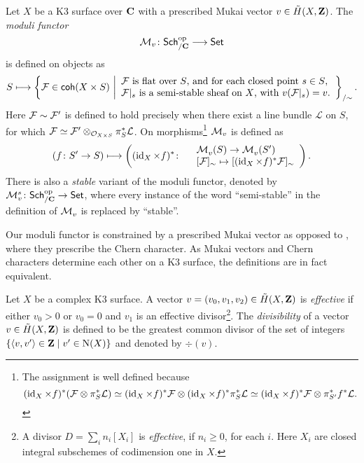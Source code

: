 \begin{definition}
    \label{Definition of moduli functor}
    Let $X$ be a K3 surface over $\mathbf C$ with a prescribed Mukai vector $v \in \,\tilde{\!{H}}(X, \mathbf Z)$. The \emph{moduli functor}
    \[
        \mathcal M_v \colon \mathsf{Sch}_{/\mathbf C}^{\text{op}} \longrightarrow \mathsf{Set}
    \]
    is defined on objects as 
    \[
        S \longmapsto \left\{\mathcal F \in \mathsf{coh}(X \times S) \ \middle| 
        \begin{array}{l}
            \text{$\mathcal F$ is flat over $S$, and for each closed point $s \in S$,} \\
            \text{$\mathcal F|_s$ is a semi-stable sheaf on $X$, with $v(\mathcal F|_s) = v$.}
        \end{array}
        \right\}_{/\sim}.
    \]
    Here $\mathcal F \sim \mathcal F'$ is defined to hold precisely when there exist a line bundle $\mathcal L$ on $S$, for which $\mathcal F \simeq \mathcal F' \otimes_{{\mathcal{O}_{X \times S}}} \pi_S^*\mathcal L$. On morphisms\footnote{
        The assignment is well defined because
        \[
            (\operatorname{id}_{X} \times f)^*(\mathcal F \otimes \pi_S^*\mathcal L) \simeq (\operatorname{id}_{X} \times f)^*\mathcal F \otimes (\operatorname{id}_{X} \times f)^*\pi_S^*\mathcal L \simeq (\operatorname{id}_{X} \times f)^*\mathcal F \otimes \pi_{S'}^*f^*\mathcal L.
        \]
    } $\mathcal M_v$ is defined as
    \[
        (f\colon S' \to S) \longmapsto \left( (\operatorname{id}_{X} \times f)^* \colon
            \begin{array}{r l}
                & \mathcal M^{}_v(S) \to \mathcal M^{}_v(S') \\
                & [\mathcal F]_\sim \mapsto [(\operatorname{id}_{X} \times f)^*\mathcal F]_\sim
            \end{array}
            \right).
    \]
    There is also a \emph{stable} variant of the moduli functor, denoted by $\mathcal M_v^{s} \colon \mathsf{Sch}_{/\mathbf C}^{\text{op}} \to \mathsf{Set}$, where every instance of the word ``semi-stable'' in the definition of $\mathcal M_v^{}$ is replaced by ``stable''.
\end{definition}

\begin{remark}
    Our moduli functor is constrained by a prescribed Mukai vector as opposed to \cite[\S 4.2, Proposition 4.15]{vanBree2020}, where they prescribe the Chern character.
    As Mukai vectors and Chern characters determine each other on a K3 surface, the definitions are in fact equivalent. 
\end{remark}

\begin{definition}
    Let $X$ be a complex K3 surface. A vector $v = (v_0, v_1, v_2) \in \,\tilde{\!{H}}(X, \mathbf Z)$ is \emph{effective} if either $v_0 > 0$ or $v_0 = 0$ and $v_1$ is an effective divisor\footnote{
        A divisor $D = \sum_i n_i[X_i]$ is \emph{effective}, if $n_i \geq 0$, for each $i$. Here $X_i$ are closed integral subschemes of codimension one in $X$.
    }. The \emph{divisibility} of a vector $v \in \,\tilde{\!{H}}(X, \mathbf Z)$ is defined to be the greatest common divisor of the set of integers $\{\langle v, v' \rangle \in \mathbf Z \mid v' \in \operatorname{N}(X)\}$ and denoted by $\div(v)$. 
\end{definition}


